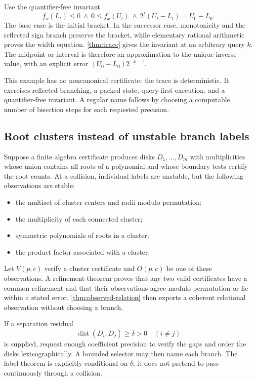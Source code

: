 Use the quantifier-free invariant
\[
  f_x(L_t)\le0\ \wedge\ 0\le f_x(U_t)
   \ \wedge\
  2^t(U_t-L_t)=U_0-L_0.
\]
The base case is the initial bracket.  In the successor case, monotonicity and
the reflected sign branch preserve the bracket, while elementary rational
arithmetic proves the width equation.  \cref{thm:trace} gives the invariant at
an arbitrary query \(k\).  The midpoint or interval is therefore an
approximation to the unique inverse value, with an explicit error
\((U_0-L_0)2^{-k-1}\).

This example has no noncanonical certificate: the trace is deterministic.  It
exercises reflected branching, a packed state, query-first execution, and a
quantifier-free invariant.  A regular name follows by choosing a computable
number of bisection steps for each requested precision.

\subsection{Root clusters instead of unstable branch labels}

Suppose a finite algebra certificate produces disks
\(D_1,\ldots,D_m\) with multiplicities whose union contains all roots of a
polynomial and whose boundary tests certify the root counts.  At a collision,
individual labels are unstable, but the following observations are stable:

\begin{itemize}
\item the multiset of cluster centers and radii modulo permutation;
\item the multiplicity of each connected cluster;
\item symmetric polynomials of roots in a cluster;
\item the product factor associated with a cluster.
\end{itemize}

Let \(V(p,c)\) verify a cluster certificate and \(O(p,c)\) be one of these
observations.  A refinement theorem proves that any two valid certificates
have a common refinement and that their observations agree modulo permutation
or lie within a stated error.  \cref{thm:observed-relation} then exports a
coherent relational observation without choosing a branch.

If a separation residual
\[
  \operatorname{dist}(D_i,D_j)\ge\delta>0\quad(i\neq j)
\]
is supplied, request enough coefficient precision to verify the gaps and order
the disks lexicographically.  A bounded selector may then name each branch.
The label theorem is explicitly conditional on \(\delta\); it does not pretend
to pass continuously through a collision.

